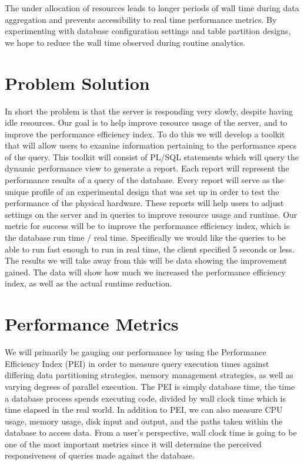 \documentclass[draftclsnofoot, onecolumn, 10pt]{IEEEtran}
\begin{document}
The under allocation of resources leads to longer periods of wall time during data aggregation and prevents accessibility to real time performance metrics.
By experimenting with database configuration settings and table partition designs, we hope to reduce the wall time observed during routine analytics.



\section*{Problem Solution}
In short the problem is that the server is responding very slowly, despite having idle resources.
Our goal is to help improve resource usage of the server, and to improve the performance efficiency index.
To do this we will develop a toolkit that will allow users to examine information pertaining to the performance specs of the query.
This toolkit will consist of PL/SQL statements which will query the dynamic performance view to generate a report.
Each report will represent the performance results of a query of the database.
Every report will serve as the unique profile of an experimental design that was set up in order to test the performance of the physical hardware.
These reports will help users to adjust settings on the server and in queries to improve resource usage and runtime.
Our metric for success will be to improve the performance efficiency index, which is the database run time / real time.
Specifically we would like the queries to be able to run fast enough to run in real time, the client specified 5 seconds or less.
The results we will take away from this will be data showing the improvement gained.
The data will show how much we increased the performance efficiency index, as well as the actual runtime reduction.  

\section*{Performance Metrics}
We will primarily be gauging our performance by using the Performance Efficiency Index (PEI) in order to measure query execution times against differing data partitioning strategies, memory management strategies, as well as varying degrees of parallel execution.
The PEI is simply database time, the time a database process spends executing code, divided by wall clock time which is time elapsed in the real world. In addition to PEI, we can also measure CPU usage, memory usage, disk input and output, and the paths taken within the database to access data.
From a user’s perspective, wall clock time is going to be one of the most important metrics since it will determine the perceived responsiveness of queries made against the database.
\end{document}
